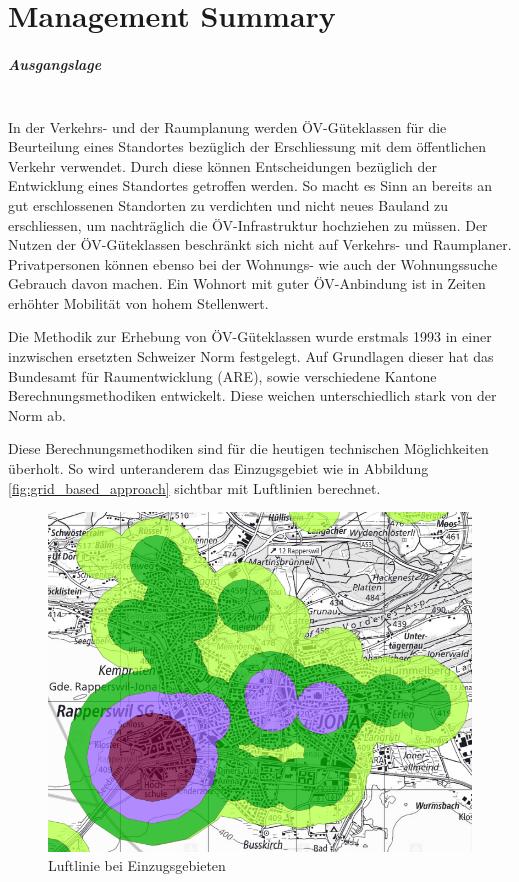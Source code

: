 
\chapter*{Management Summary}

\paragraph{Ausgangslage}~\\
In der Verkehrs- und der Raumplanung werden ÖV-Güteklassen für die Beurteilung eines Standortes bezüglich der Erschliessung mit dem öffentlichen Verkehr verwendet.
Durch diese können Entscheidungen bezüglich der Entwicklung eines Standortes getroffen werden.
So macht es Sinn an bereits an gut erschlossenen Standorten zu verdichten und nicht neues Bauland zu erschliessen, um nachträglich die ÖV-Infrastruktur hochziehen zu müssen.
Der Nutzen der ÖV-Güteklassen beschränkt sich nicht auf Verkehrs- und Raumplaner.
Privatpersonen können ebenso bei der Wohnungs- wie auch der Wohnungssuche Gebrauch davon machen.
Ein Wohnort mit guter ÖV-Anbindung ist in Zeiten erhöhter Mobilität von hohem Stellenwert.

Die Methodik zur Erhebung von ÖV-Güteklassen wurde erstmals 1993 in einer inzwischen ersetzten Schweizer Norm festgelegt.
Auf Grundlagen dieser hat das Bundesamt für Raumentwicklung (ARE), sowie verschiedene Kantone Berechnungsmethodiken entwickelt.
Diese weichen unterschiedlich stark von der Norm ab.

Diese Berechnungsmethodiken sind für die heutigen technischen Möglichkeiten überholt.
So wird unteranderem das Einzugsgebiet wie in Abbildung \ref{fig:grid_based_approach} sichtbar mit Luftlinien berechnet. 

\begin{figure}[ht]
    \centering
    \includegraphics[width=0.8\linewidth]{start/img/air_line_ARE.png}
    \caption[Luftlinie bei Einzugsgebieten]{Luftlinie bei Einzugsgebieten}
    \label{fig:air_line_ARE}
\end{figure}

